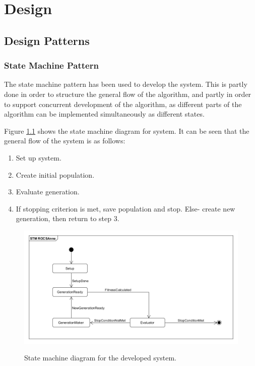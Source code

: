 
\chapter{Design}
\section{Design Patterns}
\subsection{State Machine Pattern}
The state machine pattern has been used to develop the system. This is partly done in order to structure the general flow of the algorithm, and partly in order to support concurrent development of the algorithm, as different parts of the algorithm can be implemented simultaneously as different states.

Figure \ref{fig:STM_diagram} shows the state machine diagram for system. It can be seen that the general flow of the system is as follows:
\begin{enumerate}
	\item Set up system.
	\item Create initial population.
	\item Evaluate generation.
	\item If stopping criterion is met, save population and stop. Else-  create new generation, then return to step 3.
\end{enumerate}


\begin{figure}[H]
	\centering
	{\includegraphics[width=\textwidth]{Images/STM_ROGSAnne.PNG}}\\[0.5cm]
	\caption{State machine diagram for the developed system.}
	\label{fig:STM_diagram}
\end{figure}

